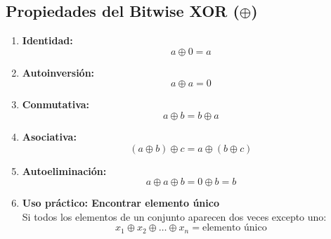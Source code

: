 \subsection{Propiedades del Bitwise XOR ($\oplus$)}
\begin{enumerate}
    \item \textbf{Identidad:} 
    \[
    a \oplus 0 = a
    \]

    \item \textbf{Autoinversión:} 
    \[
    a \oplus a = 0
    \]

    \item \textbf{Conmutativa:} 
    \[
    a \oplus b = b \oplus a
    \]

    \item \textbf{Asociativa:} 
    \[
    (a \oplus b) \oplus c = a \oplus (b \oplus c)
    \]

    \item \textbf{Autoeliminación:} 
    \[
    a \oplus a \oplus b = 0 \oplus b = b
    \]

    \item \textbf{Uso práctico: Encontrar elemento único} \\
    Si todos los elementos de un conjunto aparecen dos veces excepto uno:
    \[
    x_1 \oplus x_2 \oplus \dots \oplus x_n = \text{elemento único}
    \]
\end{enumerate}

\newpage


